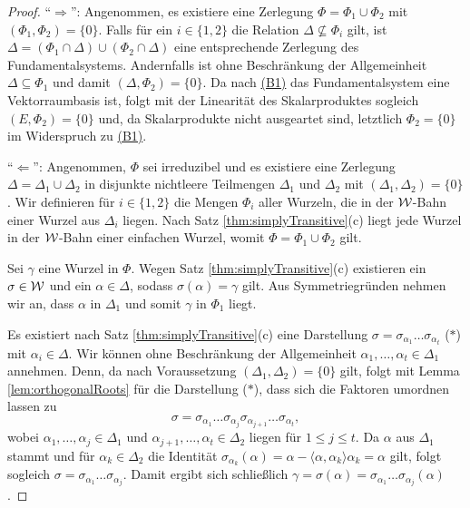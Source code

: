 \begin{proof}
  ``$\Rightarrow$'':
  Angenommen, es existiere eine Zerlegung $\Phi = \Phi_1 \cup \Phi_2$ mit $(\Phi_1, \Phi_2) = \{0\}$.
  Falls für ein $i \in \{1,2\}$ die Relation $\Delta \not\subseteq \Phi_i$ gilt, ist $\Delta = (\Phi_1 \cap \Delta) \cup (\Phi_2 \cap \Delta)$ eine entsprechende Zerlegung des Fundamentalsystems.
  Andernfalls ist ohne Beschränkung der Allgemeinheit $\Delta \subseteq \Phi_1$ und damit $(\Delta, \Phi_2) = \{0\}$.
  Da nach \hyperref[it:B1]{(B1)} das Fundamentalsystem eine Vektorraumbasis ist, folgt mit der Linearität des Skalarproduktes sogleich $(E, \Phi_2) = \{0\}$ und, da Skalarprodukte nicht ausgeartet sind, letztlich $\Phi_2 = \{0\}$ im Widerspruch zu \hyperref[it:B1]{(B1)}.

  ``$\Leftarrow$'':
  Angenommen, $\Phi$ sei irreduzibel und es existiere eine Zerlegung $\Delta = \Delta_1 \cup \Delta_2$ in disjunkte nichtleere Teilmengen $\Delta_1$ und $\Delta_2$ mit $(\Delta_1, \Delta_2) = \{0\}$.
  Wir definieren für $i \in \{1,2\}$ die Mengen $\Phi_i$ aller Wurzeln, die in der $\mathcal{W}$\hyp{}Bahn einer Wurzel aus $\Delta_i$ liegen. 
  Nach Satz \ref{thm:simplyTransitive}(c) liegt jede Wurzel in der $\mathcal{W}$\hyp{}Bahn einer einfachen Wurzel, womit $\Phi = \Phi_1 \cup \Phi_2$ gilt.

  Sei $\gamma$ eine Wurzel in $\Phi$.
  Wegen Satz \ref{thm:simplyTransitive}(c) existieren ein $\sigma \in \mathcal{W}$ und ein $\alpha \in \Delta$, sodass $\sigma(\alpha) = \gamma$ gilt.
  Aus Symmetriegründen nehmen wir an, dass $\alpha$ in $\Delta_1$ und somit $\gamma$ in $\Phi_1$ liegt.

  Es existiert nach Satz \ref{thm:simplyTransitive}(c) eine Darstellung $\sigma = \sigma_{\alpha_1} \dots \sigma_{\alpha_t}$ ($\ast$) mit $\alpha_i \in \Delta$.
  Wir können ohne Beschränkung der Allgemeinheit $\alpha_1,\dots,\alpha_t \in \Delta_1$ annehmen.
  Denn, da nach Voraussetzung $(\Delta_1, \Delta_2) = \{0\}$ gilt, folgt mit Lemma \ref{lem:orthogonalRoots} für die Darstellung ($\ast$), dass sich die Faktoren umordnen lassen zu
  \begin{displaymath}
    \sigma = \sigma_{\alpha_1} \dots \sigma_{\alpha_j} \sigma_{\alpha_{j+1}} \dots \sigma_{\alpha_t},
  \end{displaymath}
  wobei $\alpha_1,\dots,\alpha_j \in \Delta_1$ und $\alpha_{j+1},\dots,\alpha_t \in \Delta_2$ liegen für $1 \leq j \leq t$.
  Da $\alpha$ aus $\Delta_1$ stammt und für $\alpha_k \in \Delta_2$ die Identität $\sigma_{\alpha_k}(\alpha) = \alpha - \langle \alpha, \alpha_k \rangle \alpha_k = \alpha$ gilt, folgt sogleich $\sigma = \sigma_{\alpha_1} \dots \sigma_{\alpha_j}$. 
  Damit ergibt sich schließlich $\gamma = \sigma(\alpha) = \sigma_{\alpha_1} \dots \sigma_{\alpha_j}(\alpha)$.


\end{proof}
